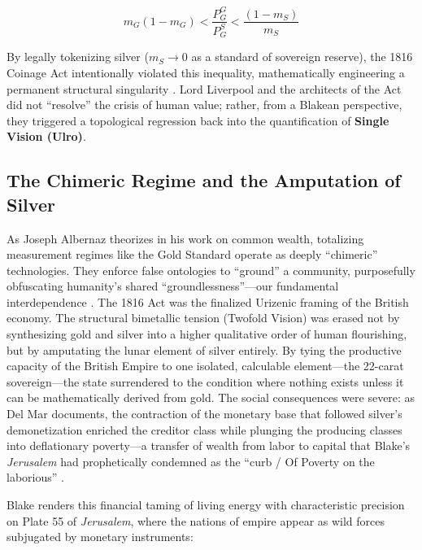 \documentclass[
]{article}
\begin{document}
\begin{equation}
\label{eq:velde_demand_shares}
m_G (1 - m_G) < \frac{P_G^G}{P_G^S} < \frac{(1 - m_S)}{m_S}
\end{equation}

By legally tokenizing silver (\(m_S \to 0\) as a standard of sovereign
reserve), the 1816 Coinage Act intentionally violated this inequality,
mathematically engineering a permanent structural singularity
\citep{velde2005bimetallism, quinn1996competing}. Lord Liverpool and the
architects of the Act did not ``resolve'' the crisis of human value;
rather, from a Blakean perspective, they triggered a topological
regression back into the quantification of \textbf{Single Vision
(Ulro)}.

\subsection{The Chimeric Regime and the Amputation of
Silver}\label{the-chimeric-regime-and-the-amputation-of-silver}

As Joseph Albernaz theorizes in his work on common wealth, totalizing
measurement regimes like the Gold Standard operate as deeply
``chimeric'' technologies. They enforce false ontologies to ``ground'' a
community, purposefully obfuscating humanity's shared
``groundlessness''---our fundamental interdependence
\citep{albernaz2024common}. The 1816 Act was the finalized Urizenic
framing of the British economy. The structural bimetallic tension
(Twofold Vision) was erased not by synthesizing gold and silver into a
higher qualitative order of human flourishing, but by amputating the
lunar element of silver entirely. By tying the productive capacity of
the British Empire to one isolated, calculable element---the 22-carat
sovereign---the state surrendered to the condition where nothing exists
unless it can be mathematically derived from gold. The social
consequences were severe: as Del Mar documents, the contraction of the
monetary base that followed silver's demonetization enriched the
creditor class while plunging the producing classes into deflationary
poverty---a transfer of wealth from labor to capital that Blake's
\emph{Jerusalem} had prophetically condemned as the ``curb / Of Poverty
on the laborious'' \citep{delmar1895history, erdman1988complete}.

Blake renders this financial taming of living energy with characteristic
precision on Plate 55 of \emph{Jerusalem}, where the nations of empire
appear as wild forces subjugated by monetary instruments:
\end{document}
